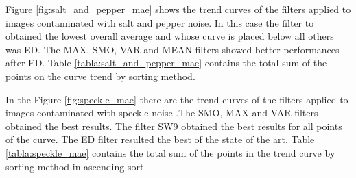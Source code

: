 Figure \ref{fig:salt_and_pepper_mae} shows the trend curves of the filters applied to images contaminated with salt and pepper noise. In this case the filter to obtained the lowest overall average and whose curve is placed below all others was ED. The MAX, SMO, VAR and MEAN filters showed better performances after ED. Table \ref{tabla:salt_and_pepper_mae} contains the total sum of the points on the curve trend by sorting method.

In the Figure \ref{fig:speckle_mae} there are the trend curves of the filters applied to images contaminated with speckle noise .The SMO, MAX and VAR filters obtained the best results. The filter SW9 obtained the best results for all points of the curve. The ED filter resulted the best of the state of the art. Table \ref{tabla:speckle_mae} contains the total sum of the points in the trend curve by sorting method in ascending sort.

%
%

